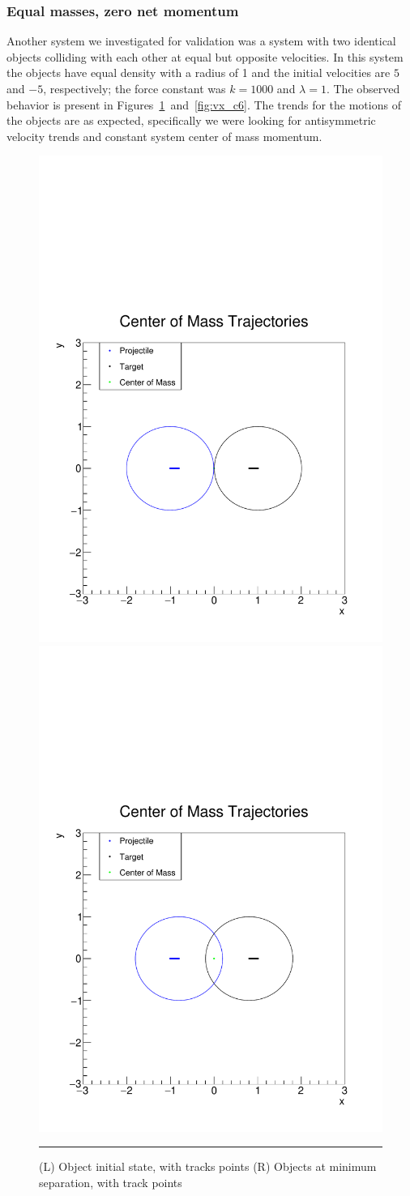 \documentclass[aps,prl,floatfix,preprint,nofootinbib]{revtex4}
\begin{document}
\subsubsection{Equal masses, zero net momentum}
Another system we investigated for validation was a system with two identical objects colliding with each other at equal but opposite velocities. In this system the objects have equal density with a radius of 1 and the initial velocities are $5$ and $-5$, respectively; the force constant was $k = 1000$ and $\lambda = 1$. The observed behavior is present in Figures~\ref{fig:tracks_c6}~and~\ref{fig:vx_c6}. The trends for the motions of the objects are as expected, specifically we were looking for antisymmetric velocity trends and constant system center of mass momentum.
\begin{figure}[h!]
  \includegraphics[width=.45\textwidth]{plots/out_c6/x_vs_y_with_ellipse.pdf}
  \includegraphics[width=.45\textwidth]{plots/out_c6/x_vs_y_with_ellipse_MS.pdf}
                  {\par\nobreak\rule[9pt]{35em}{0.5pt}\vspace{-5mm}}
                  \caption{(L) Object initial state, with tracks points (R) Objects at minimum separation, with track points}
                  \label{fig:tracks_c6}
\end{figure}
\end{document}

